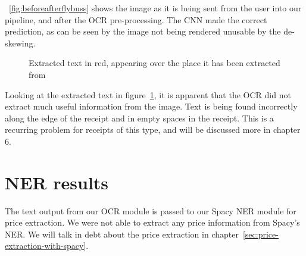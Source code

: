 \clearpage

\figurename{~\ref{fig:beforeafterflybuss}} shows the image as it is being sent from the user into our pipeline, and
after the OCR pre-processing.
The CNN made the correct prediction, as can be seen by the image not being rendered unusable by the de-skewing.


\begin{figure}[h]
    \caption{Extracted text in red, appearing over the place it has been extracted from}
    \label{fig:resultflybuss}
\end{figure}

Looking at the extracted text in figure~\ref{fig:resultflybuss}, it is apparent that the OCR did not
extract much useful information from the image.
Text is being found incorrectly along the edge of the receipt and in empty spaces in the receipt.
This is a recurring problem for receipts of this type, and will be discussed more in chapter 6.

\section{NER results}\label{sec:ner-results}
The text output from our OCR module is passed to our Spacy NER module for price extraction.
We were not able to extract any price information from Spacy's NER\@.
We will talk in debt about the price extraction in chapter~\ref{sec:price-extraction-with-spacy}.